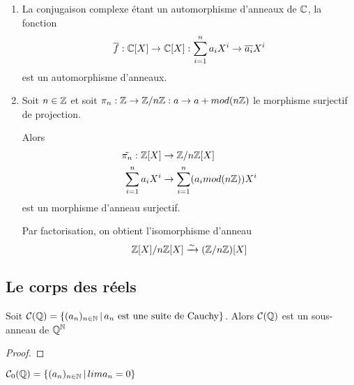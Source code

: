 \begin{exemple}
	\begin{enumerate}
		\item La conjugaison complexe étant un automorphisme d'anneaux de
			$\mathbb{C}$, la fonction
			\begin{equation}
				\overline{f} : \mathbb{C}[X] \rightarrow \mathbb{C}[X] : \sum_{i =
				1}^{n} a_{i} X^{i} \rightarrow \overline{a_{i}} X^{i}
			\end{equation}
			est un automorphisme d'anneaux.
		\item Soit $n \in \mathbb{Z}$ et soit $\pi_{n} : \mathbb{Z} \rightarrow
			\mathbb{Z} / n \mathbb{Z} : a \rightarrow a + mod(n \mathbb{Z})$ le morphisme surjectif de
		projection.

		Alors
		\begin{align}
			\tilde{\pi_{n}} : \mathbb{Z}[X] & \rightarrow \mathbb{Z} / n \mathbb{Z}[X]
			\\
			\sum_{i = 1}^{n} a_{i} X^{i} & \rightarrow \sum_{i = 1}^{n} (a_{i}
			mod(n \mathbb{Z})) X^{i}
		\end{align}
		est un morphisme d'anneau surjectif.

		Par factorisation, on obtient l'isomorphisme d'anneau
		\begin{equation}
			\mathbb{Z}[X] / n \mathbb{Z}[X] \xrightarrow{\sim} (\mathbb{Z}
			/ n \mathbb{Z})[X]
		\end{equation}

	\end{enumerate}
\end{exemple}

\subsection{Le corps des réels}

\begin{proposition}
	Soit $\mathcal{C}(\mathbb{Q}) =
	\left\{(a_{n})_{n \in \mathbb{N}} \, | \, a_{n} \text{ est une suite de Cauchy} \right\}$.
	Alors $\mathcal{C}(\mathbb{Q})$ est un sous-anneau de $\mathbb{Q}^{\mathbb{N}}$
\end{proposition}

\ifdefined\outputproof
\begin{proof}

\end{proof}
\fi

\begin{definition}
	$\mathcal{C}_{0}(\mathbb{Q}) = \left\{(a_{n})_{n \in \mathbb{N}} \, | \, lim
		a_{n} = 0 \right\}$
\end{definition}


